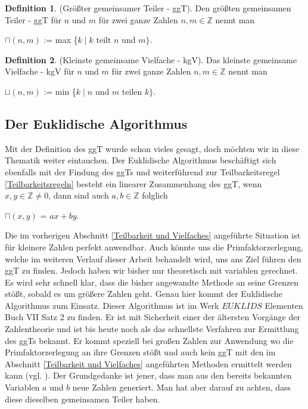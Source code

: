 \documentclass[12pt,a4paper]{article}
\theoremstyle{definition}
\newtheorem{defi}{Definition}[section]
\begin{document}
\begin{defi}(Größter gemeinsamer Teiler - ggT).\newline
Den größten gemeinsamen Teiler - ggT für $n$ und $m$ für zwei ganze Zahlen $n, m\in \mathbb{Z}$ nennt man
\begin{center}
$\sqcap(n, m)$ := max \{$k \mid k$ teilt $n$ und $m\}$.
\end{center}
\end{defi}

\begin{defi}(Kleinste gemeinsame Vielfache - kgV).\newline
Das kleinste gemeinsame Vielfache - kgV für $n$ und $m$ für zwei ganze Zahlen $n, m\in \mathbb{Z}$ nennt man
\begin{center}
$\sqcup(n, m)$ := min \{$k \mid n$ und $m$ teilen $k\}$.
\end{center}
\end{defi}

\newpage
\subsection{Der Euklidische Algorithmus}\label{Der Euklidische Algorithmus}
Mit der Definition des ggT wurde schon vieles gesagt, doch möchten wir in diese Thematik weiter eintauchen.
Der Euklidische Algorithmus beschäftigt sich ebenfalls mit der Findung des ggTs und weiterführend zur Teilbarkeitsregel \ref{Teilbarkeitsregeln} besteht ein linearer Zusammenhang des ggT, wenn $x, y \in \mathbb{Z} \neq 0$, dann sind auch $a, b \in \mathbb{Z}$ folglich
\begin{center}
$\sqcap(x, y)$ = $ax + by$.
\end{center}
Die im vorherigen Abschnitt \ref{Teilbarkeit und Vielfaches} angeführte Situation ist für kleinere Zahlen perfekt anwendbar.
Auch könnte uns die Primfaktorzerlegung, welche im weiteren Verlauf dieser Arbeit behandelt wird, uns ans Ziel führen den ggT zu finden.
Jedoch haben wir bisher nur theoretisch mit variablen gerechnet.
Es wird sehr schnell klar, dass die bisher angewandte Methode an seine Grenzen stößt, sobald es um größere Zahlen geht.
Genau hier kommt der Euklidische Algorithmus zum Einsatz.
Dieser Algorithmus ist im Werk $EUKLIDS$ Elementen Buch VII Satz 2 zu finden.
Er ist mit Sicherheit einer der ältersten Vorgänge der Zahlentheorie und ist bis heute noch als das schnellste Verfahren zur Ermittlung des ggTs bekannt.
Er kommt speziell bei großen Zahlen zur Anwendung wo die Primfaktorzerlegung an ihre Grenzen stößt und auch kein ggT mit den im Abschnitt \ref{Teilbarkeit und Vielfaches} angeführten Methoden ermittelt werden kann (vgl. \cite[83--84]{Crandall2005}).\newline
Der Grundgedanke ist jener, dass man aus den bereits bekannten Variablen $a$ und $b$ neue Zahlen generiert.
Man hat aber darauf zu achten, dass diese dieselben gemeinsamen Teiler haben.
\end{document}
